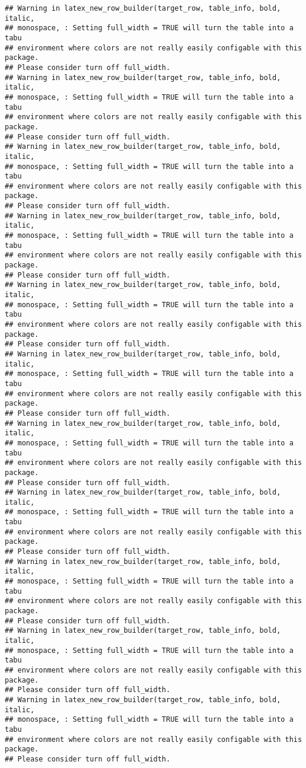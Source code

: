 \documentclass[
]{article}
\begin{document}
\begin{verbatim}
## Warning in latex_new_row_builder(target_row, table_info, bold, italic,
## monospace, : Setting full_width = TRUE will turn the table into a tabu
## environment where colors are not really easily configable with this package.
## Please consider turn off full_width.
## Warning in latex_new_row_builder(target_row, table_info, bold, italic,
## monospace, : Setting full_width = TRUE will turn the table into a tabu
## environment where colors are not really easily configable with this package.
## Please consider turn off full_width.
## Warning in latex_new_row_builder(target_row, table_info, bold, italic,
## monospace, : Setting full_width = TRUE will turn the table into a tabu
## environment where colors are not really easily configable with this package.
## Please consider turn off full_width.
## Warning in latex_new_row_builder(target_row, table_info, bold, italic,
## monospace, : Setting full_width = TRUE will turn the table into a tabu
## environment where colors are not really easily configable with this package.
## Please consider turn off full_width.
## Warning in latex_new_row_builder(target_row, table_info, bold, italic,
## monospace, : Setting full_width = TRUE will turn the table into a tabu
## environment where colors are not really easily configable with this package.
## Please consider turn off full_width.
## Warning in latex_new_row_builder(target_row, table_info, bold, italic,
## monospace, : Setting full_width = TRUE will turn the table into a tabu
## environment where colors are not really easily configable with this package.
## Please consider turn off full_width.
## Warning in latex_new_row_builder(target_row, table_info, bold, italic,
## monospace, : Setting full_width = TRUE will turn the table into a tabu
## environment where colors are not really easily configable with this package.
## Please consider turn off full_width.
## Warning in latex_new_row_builder(target_row, table_info, bold, italic,
## monospace, : Setting full_width = TRUE will turn the table into a tabu
## environment where colors are not really easily configable with this package.
## Please consider turn off full_width.
## Warning in latex_new_row_builder(target_row, table_info, bold, italic,
## monospace, : Setting full_width = TRUE will turn the table into a tabu
## environment where colors are not really easily configable with this package.
## Please consider turn off full_width.
## Warning in latex_new_row_builder(target_row, table_info, bold, italic,
## monospace, : Setting full_width = TRUE will turn the table into a tabu
## environment where colors are not really easily configable with this package.
## Please consider turn off full_width.
## Warning in latex_new_row_builder(target_row, table_info, bold, italic,
## monospace, : Setting full_width = TRUE will turn the table into a tabu
## environment where colors are not really easily configable with this package.
## Please consider turn off full_width.
\end{verbatim}
\end{document}
